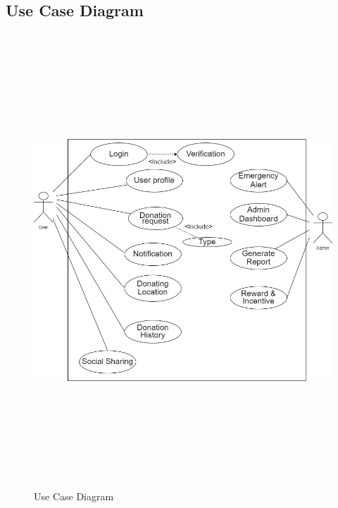 \subsection{Use Case Diagram}
\begin{figure}[h]
    \centering
    \vspace{4mm}
    \includegraphics[width=140mm,height= 170mm]{images/UsecaseFinal.jpg}
    \caption{Use Case Diagram}
    \label{fig:Use Case Diagram}
\end{figure}
 \newpage
